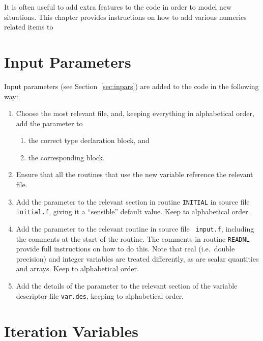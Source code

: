\label{chap:modify}

It is often useful to add extra features to the code in order to model
new situations. This chapter provides instructions on how to add
various numerics related items to \PSD

\section{Input Parameters}

Input parameters (see Section~\ref{sec:inpars}) are added to the code
in the following way:
\begin{enumerate}
\item
Choose the most relevant \INCLUDE file, and, keeping everything in
alphabetical order, add the parameter to
\begin{enumerate}
\item
the correct type declaration block, and
\item
the corresponding \COMMON block.
\end{enumerate}
\item
Ensure that all the routines that use the new variable reference the
relevant \INCLUDE file.
\item
Add the parameter to the relevant section in routine {\tt INITIAL} in
source file {\tt initial.f}, giving it a ``sensible'' default value.
Keep to alphabetical order.
\item
Add the parameter to the relevant routine in source file {\tt
input.f}, including the comments at the start of the routine. The
comments in routine {\tt READNL} provide full instructions on how to
do this. Note that real (i.e.\ double precision) and integer variables
are treated differently, as are scalar quantities and arrays. Keep to
alphabetical order.
\item
Add the details of the parameter to the relevant section of the
variable descriptor file {\tt var.des}, keeping to alphabetical order.
\end{enumerate}

\section{Iteration Variables}

